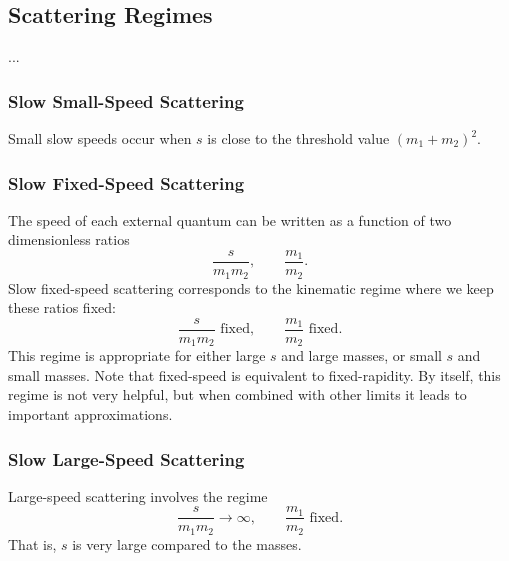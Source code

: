 \subsection{Scattering Regimes}
...
\subsubsection{Slow Small-Speed Scattering}
Small slow speeds occur when $s$ is close to the threshold value $(m_{1} + m_{2})^{2}$.
\subsubsection{Slow Fixed-Speed Scattering}
The speed of each external quantum can be written as a function of two dimensionless ratios
\begin{equation}
	\frac{s}{m_{1} m_{2}}, \qquad \frac{m_{1}}{m_{2}}.
\end{equation}
Slow fixed-speed scattering corresponds to the kinematic regime where we keep these ratios fixed:
\begin{equation}
	\frac{s}{m_{1} m_{2}} \text{ fixed}, \qquad \frac{m_{1}}{m_{2}} \text{ fixed}.
\end{equation}
This regime is appropriate for either large $s$ and large masses, or small $s$ and small masses. Note that fixed-speed is equivalent to fixed-rapidity. By itself, this regime is not very helpful, but when combined with other limits it leads to important approximations.
\subsubsection{Slow Large-Speed Scattering}
Large-speed scattering involves the regime
\begin{equation}
	\frac{s}{m_{1} m_{2}} \rightarrow \infty, \qquad \frac{m_{1}}{m_{2}} \text{ fixed}.
\end{equation}
That is, $s$ is very large compared to the masses.
